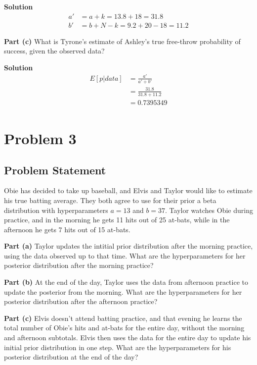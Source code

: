 \documentclass[12pt]{article}
\theoremstyle{definition}
\begin{document}
\noindent
{\bf Solution} 
\begin{align*}
a' &= a + k = 13.8 + 18 = 31.8\\
b' &= b + N - k = 9.2 + 20 - 18 = 11.2
\end{align*}


\noindent
{\bf Part (c)} What is Tyrone's estimate of Ashley's true free-throw probability of success, given the observed data?

\bigskip
\noindent
{\bf Solution} 
\begin{align*}
E[p|data] &= \frac{a'}{a' + b'}\\
&= \frac{31.8}{31.8 + 11.2}\\
&= 0.7395349\\
\end{align*}







\newpage
\section*{Problem 3}

\subsection*{Problem Statement}

Obie has decided to take up baseball, and Elvis and Taylor would like to estimate his true batting average. They both agree to use for their prior a beta distribution with hyperparameters $a = 13$ and $b = 37$. Taylor watches Obie during practice, and in the morning he gets 11 hits out of 25 at-bats, while in the afternoon he gets 7 hits out of 15 at-bats.

\bigskip
\noindent
{\bf Part (a)} Taylor updates the intitial prior distribution after the morning practice, using the data observed up to that time. What are the hyperparameters for her posterior distribution after the morning practice?

\bigskip
\noindent
{\bf Part (b)} At the end of the day, Taylor uses the data from afternoon practice to update the posterior from the morning. What are the hyperparameters for her posterior distribution after the afternoon practice?


\bigskip
\noindent
{\bf Part (c)} Elvis doesn't attend batting practice, and that evening he learns the total number of Obie's hits and at-bats for the entire day, without the morning and afternoon subtotals. Elvis then uses the data for the entire day to update his initial prior distribution in one step. What are the hyperparameters for his posterior distribution at the end of the day?
\end{document}
